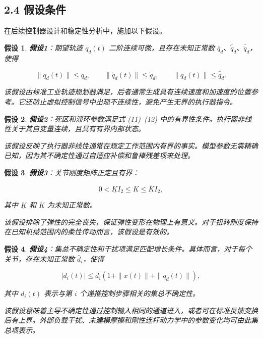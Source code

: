 \documentclass{article}
\newtheorem{assumption}{假设}
\begin{document}
\subsection{2.4 假设条件}

在后续控制器设计和稳定性分析中，施加以下假设。

\begin{assumption}
\textbf{假设1}：期望轨迹 $q_d(t)$ 二阶连续可微，且存在未知正常数 $\bar q_d$、$\bar{\dot q}_d$、$\bar{\ddot q}_d$，使得

\begin{equation}
\|q_d(t)\|\leq\bar q_d,\qquad \|\dot q_d(t)\|\leq\bar{\dot q}_d,\qquad \|\ddot q_d(t)\|\leq\bar{\ddot q}_d. \tag{16}
\end{equation}

该假设由标准工业轨迹规划器满足，后者通常生成具有连续速度和加速度的位置参考。它还防止虚拟控制信号中出现不连续性，避免产生无界的执行器指令。
\end{assumption}

\begin{assumption}
\textbf{假设2}：死区和滞环参数满足式 (11)–(12) 中的有界性条件。执行器非线性关于其自变量连续，且具有有界内部状态。

该假设反映了执行器非线性通常在规定工作范围内有界的事实。模型参数无需精确已知，因为其不确定性通过自适应补偿和鲁棒残差项来处理。
\end{assumption}

\begin{assumption}
\textbf{假设3}：关节刚度矩阵正定且有界：

\begin{equation}
0<\underline K I_2\leq K\leq\overline K I_2, \tag{17}
\end{equation}

其中 $\underline K$ 和 $\overline K$ 为未知正常数。

该假设排除了弹性的完全丧失，保证弹性变形在物理上有意义。对于扭转刚度保持在已知机械范围内的柔性传动而言，该假设是有效的。
\end{assumption}

\begin{assumption}
\textbf{假设4}：集总不确定性和干扰项满足匹配增长条件。具体而言，对于每个关节，存在未知正常数 $\bar d_i$，使得

\begin{equation}
|d_i(t)|\leq\bar d_i\left(1+\|x(t)\|+\|q_d(t)\|\right), \tag{18}
\end{equation}

其中 $d_i(t)$ 表示与第 $i$ 个递推控制步骤相关的集总不确定性。

该假设意味着主导不确定性通过控制输入相同的通道进入，或者可在标准反馈变换后有上界。外部负载干扰、未建模摩擦和刚性连杆动力学中的参数变化均可由此集总项表示。
\end{assumption}
\end{document}
